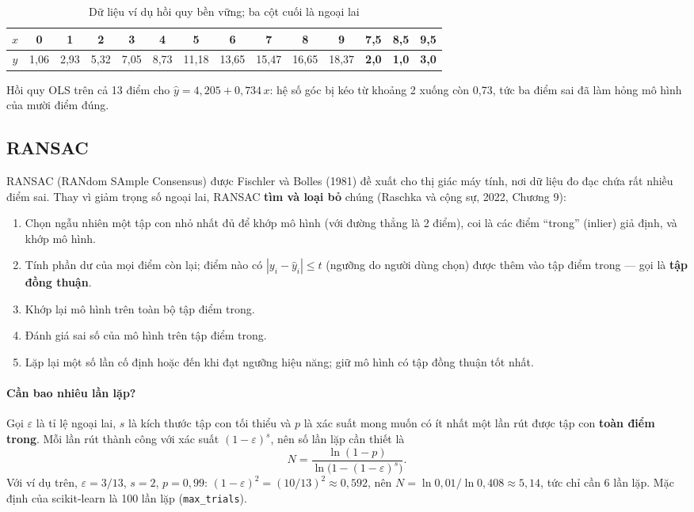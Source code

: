 \begin{table}[H]
\centering
\small
\begin{tabular}{|c|ccccccccccccc|}
\hline
$x$ & 0 & 1 & 2 & 3 & 4 & 5 & 6 & 7 & 8 & 9 & 7,5 & 8,5 & 9,5 \\ \hline
$y$ & 1,06 & 2,93 & 5,32 & 7,05 & 8,73 & 11,18 & 13,65 & 15,47 & 16,65 & 18,37 & \textbf{2,0} & \textbf{1,0} & \textbf{3,0} \\ \hline
\end{tabular}
\caption{Dữ liệu ví dụ hồi quy bền vững; ba cột cuối là ngoại lai}
\label{tab:ransac-data}
\end{table}

Hồi quy OLS trên cả 13 điểm cho $\hat{y} = 4{,}205 + 0{,}734\,x$: hệ số góc bị kéo từ khoảng 2 xuống còn 0,73, tức ba điểm sai đã làm hỏng mô hình của mười điểm đúng.

\subsection{RANSAC}

RANSAC (RANdom SAmple Consensus) được Fischler và Bolles (1981) đề xuất cho thị giác máy tính, nơi dữ liệu đo đạc chứa rất nhiều điểm sai. Thay vì giảm trọng số ngoại lai, RANSAC \textbf{tìm và loại bỏ} chúng (Raschka và cộng sự, 2022, Chương 9):
\begin{enumerate}
    \item Chọn ngẫu nhiên một tập con nhỏ nhất đủ để khớp mô hình (với đường thẳng là 2 điểm), coi là các điểm ``trong'' (inlier) giả định, và khớp mô hình.
    \item Tính phần dư của mọi điểm còn lại; điểm nào có $|y_i - \hat{y}_i| \leq t$ (ngưỡng do người dùng chọn) được thêm vào tập điểm trong --- gọi là \textbf{tập đồng thuận}.
    \item Khớp lại mô hình trên toàn bộ tập điểm trong.
    \item Đánh giá sai số của mô hình trên tập điểm trong.
    \item Lặp lại một số lần cố định hoặc đến khi đạt ngưỡng hiệu năng; giữ mô hình có tập đồng thuận tốt nhất.
\end{enumerate}

\paragraph{Cần bao nhiêu lần lặp?} Gọi $\varepsilon$ là tỉ lệ ngoại lai, $s$ là kích thước tập con tối thiểu và $p$ là xác suất mong muốn có ít nhất một lần rút được tập con \textbf{toàn điểm trong}. Mỗi lần rút thành công với xác suất $(1 - \varepsilon)^s$, nên số lần lặp cần thiết là
\begin{equation}
    N = \frac{\ln(1 - p)}{\ln\big(1 - (1 - \varepsilon)^s\big)} .
\end{equation}
Với ví dụ trên, $\varepsilon = 3/13$, $s = 2$, $p = 0{,}99$: $(1 - \varepsilon)^2 = (10/13)^2 \approx 0{,}592$, nên $N = \ln 0{,}01 / \ln 0{,}408 \approx 5{,}14$, tức chỉ cần 6 lần lặp. Mặc định của scikit-learn là 100 lần lặp (\texttt{max\_trials}).

